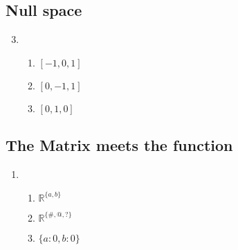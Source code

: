 \documentclass{article}
\begin{document}
    \subsection{Null space}
    \begin{enumerate}
        \setcounter{enumi}{2}
        \item 
            \begin{enumerate}
                \item $[-1, 0, 1]$
                \item $[0, -1, 1]$
                \item $[0, 1, 0]$
            \end{enumerate}
    \end{enumerate}
    \subsection{The Matrix meets the function}
    \begin{enumerate}
        \item 
            \begin{enumerate}
                \item $\mathbb{R}^{\{a,b\}}$
                \item $\mathbb{R}^{\{\#,@,?\}}$
                \item $\{a: 0, b: 0\}$
            \end{enumerate}
    \end{enumerate}
\end{document}
